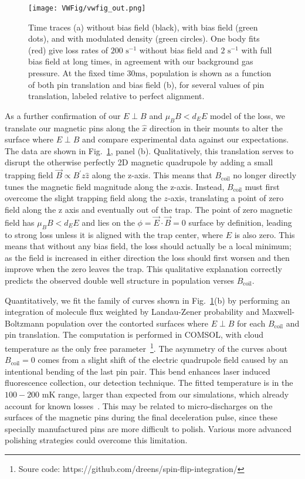 \documentclass[%
 reprint,
groupedaddress,
 amsmath,amssymb,
 aps,
prl,
]{revtex4-1}
\newcommand{\epb}{{$E\!\perp\!B$}}
\begin{document}
\begin{figure}[tb]
\texttt{[image: VWFig/vwfig\_out.png]}%
\caption{
Time traces (a) without bias field (black), with bias field (green dots), and with modulated density (green circles). One body fits (red) give loss rates of $200\text{ s}^{-1}$ without bias field and $2\text{ s}^{-1}$ with full bias field at long times, in agreement with our background gas pressure. At the fixed time $30 \text{ms}$, population is shown as a function of both pin translation and bias field (b), for several values of pin translation, labeled relative to perfect alignment. 
\label{fig:WVplot}}
\end{figure}


As a further confirmation of our \epb{}  and $\mu_BB<d_EE$ model of the loss, we translate our magnetic pins along the $\hat{x}$ direction in their mounts to alter the surface where \epb{}  and compare experimental data against our expectations. The data are shown in Fig.~\ref{fig:WVplot}, panel (b). Qualitatively, this translation serves to disrupt the otherwise perfectly 2D magnetic quadrupole by adding a small trapping field $\vec{B}\propto B^\prime z\hat{z}$ along the z-axis. This means that $B_\text{coil}$ no longer directly tunes the magnetic field magnitude along the z-axis. Instead, $B_\text{coil}$ must first overcome the slight trapping field along the $z$-axis, translating a point of zero field along the z axis and eventually out of the trap. The point of zero magnetic field has $\mu_BB<d_EE$ and lies on the $\phi=\vec{E}\cdot\vec{B}=0$ surface by definition, leading to strong loss unless it is aligned with the trap center, where $E$ is also zero. This means that without any bias field, the loss should actually be a local minimum; as the field is increased in either direction the loss should first worsen and then improve when the zero leaves the trap. This qualitative explanation correctly predicts the observed double well structure in population verses $B_\text{coil}$.

Quantitatively, we fit the family of curves shown in Fig.~\ref{fig:WVplot}(b) by performing an integration of molecule flux weighted by Landau-Zener probability and Maxwell-Boltzmann population over the contorted surfaces where \epb{} for each $B_\text{coil}$ and pin translation. The computation is performed in COMSOL, with cloud temperature as the only free parameter~\footnote{Soure code: https://github.com/dreens/spin-flip-integration/}. The asymmetry of the curves about $B_\text{coil}=0$ comes from a slight shift of the electric quadrupole field caused by an intentional bending of the last pin pair. This bend enhances laser induced fluorescence collection, our detection technique. The fitted temperature is in the $100-200$ mK range, larger than expected from our simulations, which already account for known losses~\cite{Sawyer2008a}. This may be related to micro-discharges on the surfaces of the magnetic pins during the final deceleration pulse, since these specially manufactured pins are more difficult to polish. Various more advanced polishing strategies could overcome this limitation.
\end{document}
